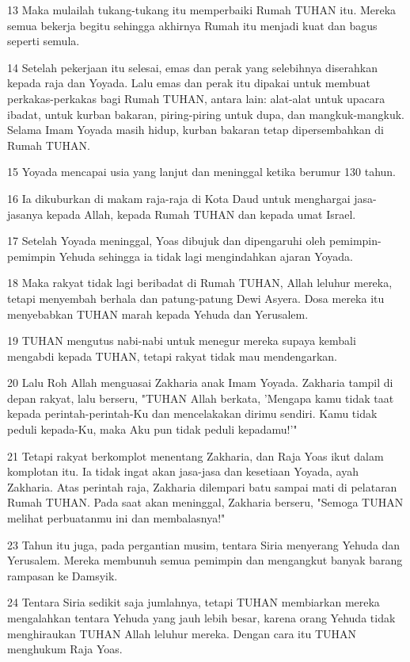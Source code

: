 \par 13 Maka mulailah tukang-tukang itu memperbaiki Rumah TUHAN itu. Mereka semua bekerja begitu sehingga akhirnya Rumah itu menjadi kuat dan bagus seperti semula.
\par 14 Setelah pekerjaan itu selesai, emas dan perak yang selebihnya diserahkan kepada raja dan Yoyada. Lalu emas dan perak itu dipakai untuk membuat perkakas-perkakas bagi Rumah TUHAN, antara lain: alat-alat untuk upacara ibadat, untuk kurban bakaran, piring-piring untuk dupa, dan mangkuk-mangkuk. Selama Imam Yoyada masih hidup, kurban bakaran tetap dipersembahkan di Rumah TUHAN.
\par 15 Yoyada mencapai usia yang lanjut dan meninggal ketika berumur 130 tahun.
\par 16 Ia dikuburkan di makam raja-raja di Kota Daud untuk menghargai jasa-jasanya kepada Allah, kepada Rumah TUHAN dan kepada umat Israel.
\par 17 Setelah Yoyada meninggal, Yoas dibujuk dan dipengaruhi oleh pemimpin-pemimpin Yehuda sehingga ia tidak lagi mengindahkan ajaran Yoyada.
\par 18 Maka rakyat tidak lagi beribadat di Rumah TUHAN, Allah leluhur mereka, tetapi menyembah berhala dan patung-patung Dewi Asyera. Dosa mereka itu menyebabkan TUHAN marah kepada Yehuda dan Yerusalem.
\par 19 TUHAN mengutus nabi-nabi untuk menegur mereka supaya kembali mengabdi kepada TUHAN, tetapi rakyat tidak mau mendengarkan.
\par 20 Lalu Roh Allah menguasai Zakharia anak Imam Yoyada. Zakharia tampil di depan rakyat, lalu berseru, "TUHAN Allah berkata, 'Mengapa kamu tidak taat kepada perintah-perintah-Ku dan mencelakakan dirimu sendiri. Kamu tidak peduli kepada-Ku, maka Aku pun tidak peduli kepadamu!'"
\par 21 Tetapi rakyat berkomplot menentang Zakharia, dan Raja Yoas ikut dalam komplotan itu. Ia tidak ingat akan jasa-jasa dan kesetiaan Yoyada, ayah Zakharia. Atas perintah raja, Zakharia dilempari batu sampai mati di pelataran Rumah TUHAN. Pada saat akan meninggal, Zakharia berseru, "Semoga TUHAN melihat perbuatanmu ini dan membalasnya!"
\par 23 Tahun itu juga, pada pergantian musim, tentara Siria menyerang Yehuda dan Yerusalem. Mereka membunuh semua pemimpin dan mengangkut banyak barang rampasan ke Damsyik.
\par 24 Tentara Siria sedikit saja jumlahnya, tetapi TUHAN membiarkan mereka mengalahkan tentara Yehuda yang jauh lebih besar, karena orang Yehuda tidak menghiraukan TUHAN Allah leluhur mereka. Dengan cara itu TUHAN menghukum Raja Yoas.
